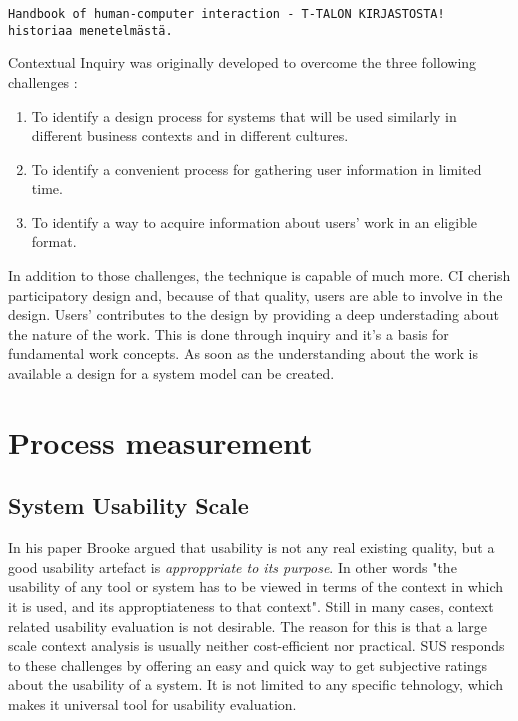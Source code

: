 \documentclass[12pt,a4paper,oneside,pdftex]{report}
\begin{document}
\texttt{Handbook of human-computer interaction - T-TALON KIRJASTOSTA! historiaa menetelmästä.  }

Contextual Inquiry was originally developed to overcome the three following challenges \cite{RefWorks:14}: 
\begin{enumerate}
\item To identify a design process for systems that will be used similarly in different business contexts and in different cultures.
\item To identify a convenient process for gathering user information in limited time.
\item To identify a way to acquire information about users' work in an eligible format.
\end{enumerate}

In addition to those challenges, the technique is capable of much more. CI cherish participatory design and, because of that quality, users are able to involve in the design. 
Users' contributes to the design by providing a deep understading about the nature of the work. This is done through inquiry and it's a basis for fundamental work concepts.  As soon as the understanding about the work is available 
a design for a system model can be created. \cite{RefWorks:14}

  

\section{Process measurement}
\label{sec:measurement}
    
        \subsection{System Usability Scale}
	In his paper Brooke \cite{RefWorks:10} argued that usability is not any real existing quality, but a good usability artefact is \emph{approppriate to its purpose}. In other words "the usability of any tool or system has to be viewed in terms of the context in which it is 			used, and its approptiateness to that context"\cite{RefWorks:10}. Still in many cases, context related usability evaluation is not desirable. The reason for this is that a large scale context analysis is usually neither cost-efficient nor practical.\cite{RefWorks:10} 
	SUS responds to these challenges by offering an easy and quick way to get subjective ratings about the usability of a system. It is not limited to any specific tehnology, which makes it universal tool for usability evaluation. \cite{RefWorks:12}
\end{document}
